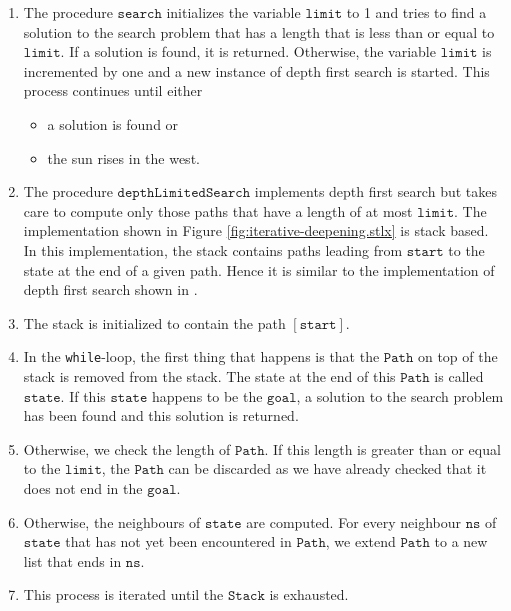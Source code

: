 \begin{enumerate}
\item The procedure $\mathtt{search}$ initializes the variable $\mathtt{limit}$ to 1 and tries to find a solution
      to the search problem that has a length that is less than or equal to $\mathtt{limit}$.  If a solution is
      found, it is returned.  Otherwise, the variable $\mathtt{limit}$ is incremented by one and a
      new instance of depth first search is started.  This process continues until either 
      \begin{itemize}
      \item a solution is found \qquad or 
      \item the sun rises in the west. 
      \end{itemize}
\item The procedure $\mathtt{depthLimitedSearch}$ implements depth first search but takes care to compute only
      those paths that have a length of at most $\mathtt{limit}$.  The implementation shown in Figure
      \ref{fig:iterative-deepening.stlx} is stack based.  In this implementation,
      the stack contains paths leading from $\mathtt{start}$ to the state at the end of a given
      path.  Hence it is similar to the implementation of depth first search shown in
      . 
\item The stack is initialized to contain the path $\mathtt{[start]}$.
\item In the \texttt{while}-loop, the first thing that happens is that the $\mathtt{Path}$ on top of
      the stack is removed from the stack.  The state at the end of this $\mathtt{Path}$ is called $\mathtt{state}$.
      If this $\mathtt{state}$ happens to be the $\mathtt{goal}$, a solution to the search problem
      has been found and this solution is returned.
\item Otherwise, we check the length of $\mathtt{Path}$.  If this length is greater than or equal to the
      $\mathtt{limit}$, the $\mathtt{Path}$ can be discarded as we have already checked that it
      does not end in the $\mathtt{goal}$.
\item Otherwise, the neighbours of $\mathtt{state}$ are computed.  For every neighbour $\mathtt{ns}$
      of $\mathtt{state}$ that has not yet been encountered in $\mathtt{Path}$, we extend
      $\mathtt{Path}$ to a new list that ends in $\mathtt{ns}$.
\item This process is iterated until the $\mathtt{Stack}$ is exhausted.
\end{enumerate}
